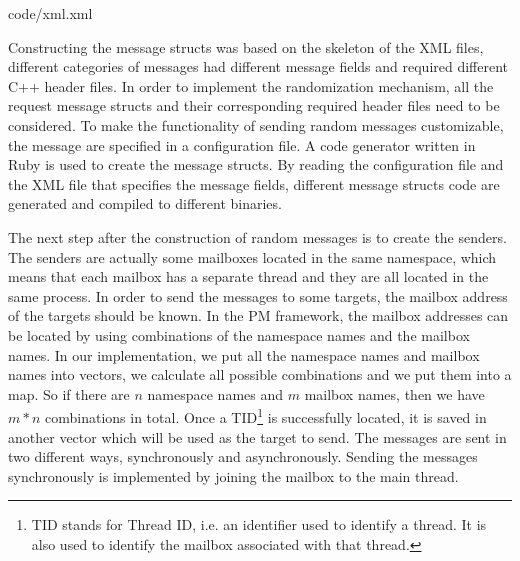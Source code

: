 \begin{minipage}{.96\columnwidth}

{code/xml.xml}
\end{minipage}

Constructing the message structs was based on the skeleton of the XML files, different categories of messages had different message fields and required different C++ header files. In order to implement the randomization mechanism, all the request message structs and their corresponding required header files need to be considered. %
To make the functionality of sending random messages customizable, 
the message are specified in a configuration file. A code generator written in Ruby is used to create the message structs. By reading the configuration file and the XML file that specifies the message fields, different message structs code are generated and compiled to different binaries. 

The next step after the construction of random messages is %
to create the senders. The senders are actually some mailboxes located in the same namespace, which means that each mailbox has a separate thread and they are all located in the same process. In order to send the messages to some targets, the mailbox address of the targets should be known. In the PM framework, the mailbox addresses can be located by using combinations of the namespace names and the mailbox names. In our implementation, we put all the namespace names and mailbox names into vectors, we calculate 
all possible combinations and we put them into a map.  %
So if there are $n$ namespace names and $m$ mailbox names, then we have $m*n$ combinations in total. Once a TID\footnote{TID stands for Thread ID, i.e. an identifier used to identify a thread. It is also used to identify the mailbox associated with that thread.} is successfully located, it is saved in another vector which will be used as the target to send. The messages are sent in two different ways, synchronously and asynchronously. Sending the messages synchronously is  implemented by joining the mailbox to the main thread.  


